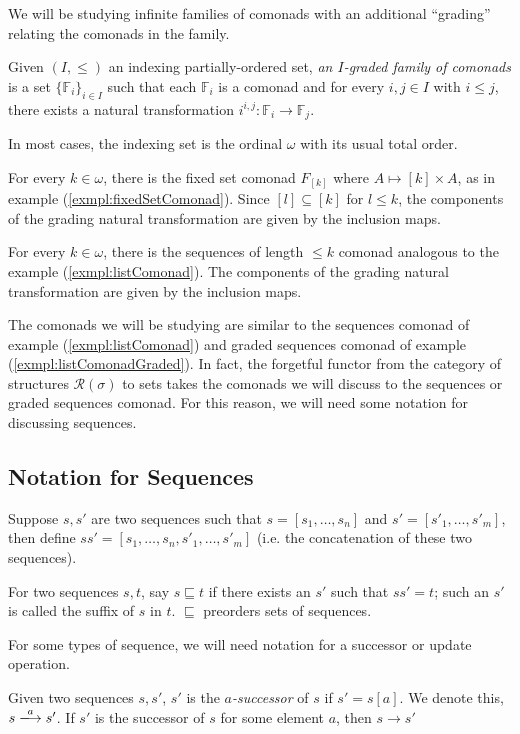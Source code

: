 We will be studying infinite families of comonads with an additional ``grading'' relating the comonads in the family.
\begin{defn}
Given $(I,\leq)$ an indexing partially-ordered set, \textit{an $I$-graded family of comonads} is a set $\{\mathbb{F}_{i}\}_{i \in I}$ such that each $\mathbb{F}_{i}$ is a comonad and for every $i, j \in I$ with $i \leq j$, there exists a natural transformation $i^{i,j}:\mathbb{F}_{i} \longrightarrow \mathbb{F}_{j}$.  
\end{defn}
In most cases, the indexing set is the ordinal $\omega$ with its usual total order.  
\begin{exmpl}
For every $k \in \omega$, there is the fixed set comonad $F_{[k]}$ where $A \mapsto [k] \times A$, as in example (\ref{exmpl:fixedSetComonad}). Since $[l] \subseteq [k]$ for $l \leq k$, the components of the grading natural transformation are given by the inclusion maps. 
\end{exmpl}
\begin{exmpl}
For every $k \in \omega$, there is the sequences of length $\leq k$ comonad analogous to the example (\ref{exmpl:listComonad}). The components of the grading natural transformation are given by the inclusion maps. 
\label{exmpl:listComonadGraded}
\end{exmpl}
\begin{rmrk}
The comonads we will be studying are similar to the sequences comonad of example (\ref{exmpl:listComonad}) and graded sequences comonad of example (\ref{exmpl:listComonadGraded}). In fact, the forgetful functor from the category of structures $\mathcal{R}(\sigma)$ to sets takes the comonads we will discuss to the sequences or graded sequences comonad. For this reason, we will need some notation for discussing sequences. 
\end{rmrk}
\subsection*{Notation for Sequences}
\begin{defn}
Suppose $s,s'$ are two sequences such that $s = [s_{1},\dots,s_{n}]$ and $s' = [s'_{1},\dots,s'_{m}]$, then define $ss' = [s_{1},
\dots,s_{n},s'_{1},\dots,s'_{m}]$ (i.e. the concatenation of these two sequences).
\label{defn:concat}
\end{defn}
\begin{defn}
For two sequences $s,t$, say $s \sqsubseteq t$ if there exists an $s'$ such that $ss' = t$; such an $s'$ is called the suffix of $s$ in $t$. $\sqsubseteq$ preorders sets of sequences.  
\end{defn}
For some types of sequence, we will need notation for a successor or update operation. 
\begin{defn}
Given two sequences $s,s'$, $s'$ is the \textit{$a$-successor} of $s$ if $s' = s[a]$. We denote this, $s \xlongrightarrow{a} s'$. If $s'$ is the successor of $s$ for some element $a$, then $s \longrightarrow s'$
\end{defn}
